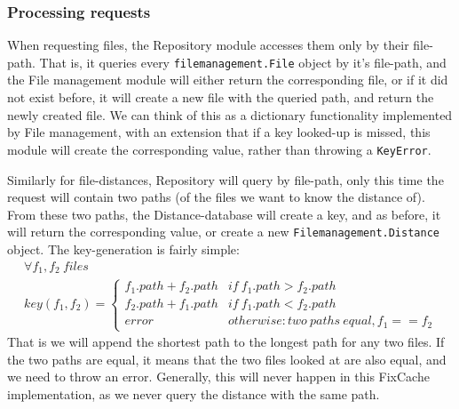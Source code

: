 \documentclass[12pt,twoside,notitlepage]{report}
\newcommand{\fxch}{FixCache}
\begin{document}
\subsubsection*{Processing requests}
When requesting files, the Repository module accesses them only by their file-path. That is, it queries every \texttt{filemanagement.File} object by it's file-path, and the File management module will either return the corresponding file, or if it did not exist before, it will create a new file with the queried path, and return the newly created file. We can think of this as a dictionary functionality implemented by File management, with an extension that if a key looked-up is missed, this module will create the corresponding value, rather than throwing a \texttt{KeyError}.

Similarly for file-distances, Repository will query by file-path, only this time the request will contain two paths (of the files we want to know the distance of). From these two paths, the Distance-database will create a key, and as before, it will return the corresponding value, or create a new \texttt{Filemanagement.Distance} object. The key-generation is fairly simple:
\begin{gather*}\label{distance_key} 
	\forall f_1, f_2\ files \\
	key(f_1, f_2) = \begin{cases}
						f_1.path+f_2.path &if\ f_1.path > f_2.path\\
						f_2.path+f_1.path &if\ f_1.path < f_2.path\\
						error &otherwise: two\ paths\ equal, f_1 == f_2
					\end{cases}
\end{gather*}
That is we will append the shortest path to the longest path for any two files. If the two paths are equal, it means that the two files looked at  are also equal, and we need to throw an error. Generally, this will never happen in this \fxch{} implementation, as we never query the distance with the same path.
\end{document}
